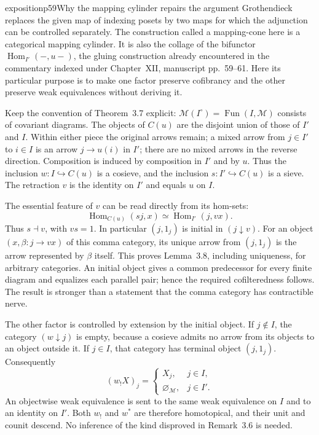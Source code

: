 \begin{dcomment}{exposition}{p59}{Why the mapping cylinder repairs the argument}
Grothendieck replaces the given map of indexing posets by two maps for which the adjunction can be controlled separately. The construction called a mapping-cone here is a categorical mapping cylinder. It is also the collage of the bifunctor $\operatorname{Hom}_{I'}(-,u-)$, the gluing construction already encountered in the commentary indexed under Chapter~XII, manuscript pp.~59--61. Here its particular purpose is to make one factor preserve cofibrancy and the other preserve weak equivalences without deriving it.

Keep the convention of Theorem~3.7 explicit: $\mathcal M(I^\circ)=\operatorname{Fun}(I,\mathcal M)$ consists of covariant diagrams. The objects of $C(u)$ are the disjoint union of those of $I'$ and $I$. Within either piece the original arrows remain; a mixed arrow from $j\in I'$ to $i\in I$ is an arrow $j\to u(i)$ in $I'$; there are no mixed arrows in the reverse direction. Composition is induced by composition in $I'$ and by $u$. Thus the inclusion $w:I\hookrightarrow C(u)$ is a cosieve, and the inclusion $s:I'\hookrightarrow C(u)$ is a sieve. The retraction $v$ is the identity on $I'$ and equals $u$ on $I$.

The essential feature of $v$ can be read directly from its hom-sets:
\[
 \operatorname{Hom}_{C(u)}(s j,x)
 \simeq\operatorname{Hom}_{I'}(j,vx).
\]
Thus $s\dashv v$, with $vs=1$. In particular $(j,1_j)$ is initial in $(j\downarrow v)$. For an object $(x,\beta:j\to vx)$ of this comma category, its unique arrow from $(j,1_j)$ is the arrow represented by $\beta$ itself. This proves Lemma~3.8, including uniqueness, for arbitrary categories. An initial object gives a common predecessor for every finite diagram and equalizes each parallel pair; hence the required cofilteredness follows. The result is stronger than a statement that the comma category has contractible nerve.

The other factor is controlled by extension by the initial object. If $j\notin I$, the category $(w\downarrow j)$ is empty, because a cosieve admits no arrow from its objects to an object outside it. If $j\in I$, that category has terminal object $(j,1_j)$. Consequently
\[
 (w_!X)_j=\begin{cases}
 X_j,&j\in I,\\
 \varnothing_{\mathcal M},&j\in I'.
 \end{cases}
\]
An objectwise weak equivalence is sent to the same weak equivalence on $I$ and to an identity on $I'$. Both $w_!$ and $w^*$ are therefore homotopical, and their unit and counit descend. No inference of the kind disproved in Remark~3.6 is needed.


\end{dcomment}
